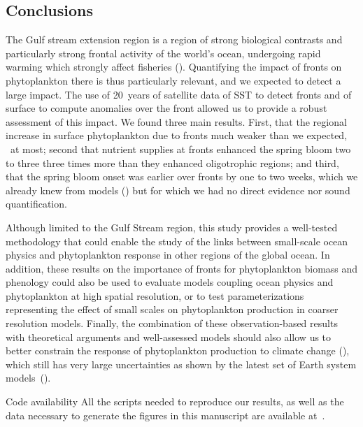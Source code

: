 \subsection{Conclusions}

The Gulf stream extension region is a region of strong biological contrasts and particularly strong frontal activity of the world's ocean, undergoing rapid warming which strongly affect fisheries (\cite{pershing_2015, neto_2021}).
Quantifying the impact of fronts on phytoplankton there is thus particularly relevant, and we expected to detect a large impact.
The use of 20~years of satellite data of SST to detect fronts and of surface  to compute anomalies over the front allowed us to provide a robust assessment of this impact.
We found three main results.
First, that the regional increase in surface phytoplankton due to fronts much weaker than we expected, ~at most; second that nutrient supplies at fronts enhanced the spring bloom two to three three times more than they enhanced oligotrophic regions; and third, that the spring bloom onset was earlier over fronts by one to two weeks, which we already knew from models (\cite{karleskind_2011, mahadevan_2012}) but for which we had no direct evidence nor sound quantification.

Although limited to the Gulf Stream region, this study provides a well-tested methodology that could enable the study of the links between small-scale ocean physics and phytoplankton response in other regions of the global ocean.
In addition, these results on the importance of fronts for phytoplankton biomass and phenology could also be used to evaluate models coupling ocean physics and phytoplankton at high spatial resolution, or to test parameterizations representing the effect of small scales on phytoplankton production in coarser resolution models.
Finally, the combination of these observation-based results with theoretical arguments and well-assessed models should also allow us to better constrain the response of phytoplankton production to climate change (\cite{couespel_2021}), which still has very large uncertainties as shown by the latest set of Earth system models~(\cite{kwiatkowski_2020}).


\begin{articleSubBlock}{Code availability}
  All the scripts needed to reproduce our results, as well as the data necessary to generate the figures in this manuscript are available at~\textcite{haeck_2022_zenodo}.
\end{articleSubBlock}


